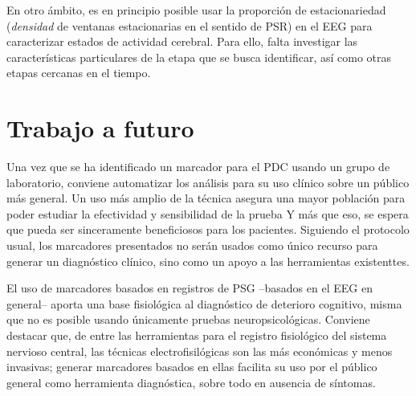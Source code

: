 En otro ámbito, es en principio posible usar la
proporción de estacionariedad (\textit{densidad} de ventanas estacionarias en el sentido de
PSR) en el EEG para caracterizar estados de actividad cerebral. Para ello, falta 
investigar las características particulares de la etapa que se busca identificar, así como otras
etapas cercanas en el tiempo.


\section{Trabajo a futuro}

Una vez que se ha identificado un marcador para el PDC usando un grupo de laboratorio,
conviene automatizar los análisis para su uso clínico sobre un público más general.
%
Un uso más amplio de la técnica asegura una mayor población para poder estudiar la 
efectividad y sensibilidad de la prueba
Y más que eso, se espera que pueda ser sinceramente beneficiosos para los pacientes. Siguiendo el
protocolo usual, los marcadores presentados no serán usados como único recurso para generar
un diagnóstico clínico, sino como un apoyo a las herramientas existenttes.

El uso de marcadores basados en registros de PSG --basados en el EEG en general-- aporta una
base fisiológica al diagnóstico de deterioro cognitivo, misma que no es posible usando
únicamente pruebas neuropsicológicas.
%
Conviene destacar que, de entre las herramientas para el registro fisiológico del sistema nervioso
central, las técnicas electrofisilógicas son las más económicas y menos invasivas;
generar marcadores basados en ellas facilita su uso por el público general como herramienta 
diagnóstica, sobre todo en ausencia de síntomas.

